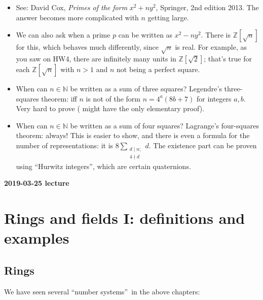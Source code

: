 \documentclass[numbers=enddot,12pt,final,onecolumn,notitlepage]{scrartcl}%
\numberwithin{exer}{subsection}
\theoremstyle{definition}
\let\sumnonlimits\sum
\renewcommand{\sum}{\sumnonlimits\limits}
\begin{document}
\begin{itemize}
\item See: David Cox, \textit{Primes of the form }$x^{2}+ny^{2}$, Springer,
2nd edition 2013. The answer becomes more complicated with $n$ getting large.

\item We can also ask when a prime $p$ can be written as $x^{2}-ny^{2}$. There
is $\mathbb{Z}\left[  \sqrt{n}\right]  $ for this, which behaves much
differently, since $\sqrt{n}$ is real. For example, as you saw on HW4, there
are infinitely many units in $\mathbb{Z}\left[  \sqrt{2}\right]  $; that's
true for each $\mathbb{Z}\left[  \sqrt{n}\right]  $ with $n>1$ and $n$ not
being a perfect square.

\item When can $n\in\mathbb{N}$ be written as a sum of three squares?
Legendre's three-squares theorem: iff $n$ is not of the form $n=4^{a}\left(
8b+7\right)  $ for integers $a,b$. Very hard to prove (\cite[Chapter
XIII]{Uspensky-Heaslet} might have the only elementary proof).

\item When can $n\in\mathbb{N}$ be written as a sum of four squares?
Lagrange's four-squares theorem: always! This is easier to show, and there is
even a formula for the number of representations: it is $8\sum
_{\substack{d\mid n;\\4\nmid d}}d$. The existence part can be proven using
\textquotedblleft Hurwitz integers\textquotedblright, which are certain quaternions.
\end{itemize}

\begin{center}
\textbf{2019-03-25 lecture}
\end{center}

\section{Rings and fields I: definitions and examples}

\subsection{Rings}

We have seen several \textquotedblleft number systems\textquotedblright\ in
the above chapters:
\end{document}
